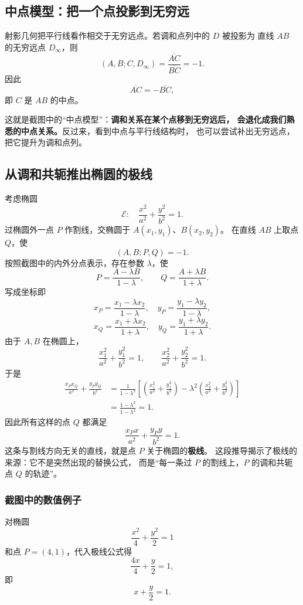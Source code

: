 \documentclass[UTF8]{ctexart}
\begin{document}
	\subsection{中点模型：把一个点投影到无穷远}
	
	射影几何把平行线看作相交于无穷远点。若调和点列中的 $D$ 被投影为
	直线 $AB$ 的无穷远点 $D_\infty$，则
	\[
	(A,B;C,D_\infty)
	=
	\frac{\overline{AC}}{\overline{BC}}
	=-1.
	\]
	因此
	\[
	\overline{AC}=-\overline{BC},
	\]
	即 $C$ 是 $AB$ 的中点。
	
	这就是截图中的“中点模型”：\textbf{调和关系在某个点移到无穷远后，
	会退化成我们熟悉的中点关系。}反过来，看到中点与平行线结构时，
	也可以尝试补出无穷远点，把它提升为调和点列。
	
	\subsection{从调和共轭推出椭圆的极线}
	
	考虑椭圆
	\[
	\mathcal E:\quad \frac{x^2}{a^2}+\frac{y^2}{b^2}=1.
	\]
	过椭圆外一点 $P$ 作割线，交椭圆于 $A(x_1,y_1)$、$B(x_2,y_2)$。
	在直线 $AB$ 上取点 $Q$，使
	\[
	(A,B;P,Q)=-1.
	\]
	按照截图中的内外分点表示，存在参数 $\lambda$，使
	\[
	P=\frac{A-\lambda B}{1-\lambda},
	\qquad
	Q=\frac{A+\lambda B}{1+\lambda}.
	\]
	写成坐标即
	\[
	x_P=\frac{x_1-\lambda x_2}{1-\lambda},
	\quad
	y_P=\frac{y_1-\lambda y_2}{1-\lambda},
	\]
	\[
	x_Q=\frac{x_1+\lambda x_2}{1+\lambda},
	\quad
	y_Q=\frac{y_1+\lambda y_2}{1+\lambda}.
	\]
	由于 $A,B$ 在椭圆上，
	\[
	\frac{x_1^2}{a^2}+\frac{y_1^2}{b^2}=1,
	\qquad
	\frac{x_2^2}{a^2}+\frac{y_2^2}{b^2}=1.
	\]
	于是
	\begin{align*}
	\frac{x_Px_Q}{a^2}+\frac{y_Py_Q}{b^2}
	&=
	\frac{1}{1-\lambda^2}
	\left[
	\left(\frac{x_1^2}{a^2}+\frac{y_1^2}{b^2}\right)
	-\lambda^2
	\left(\frac{x_2^2}{a^2}+\frac{y_2^2}{b^2}\right)
	\right]\\
	&=\frac{1-\lambda^2}{1-\lambda^2}=1.
	\end{align*}
	因此所有这样的点 $Q$ 都满足
	\[
	\boxed{
	\frac{x_Px}{a^2}+\frac{y_Py}{b^2}=1
	}.
	\]
	这条与割线方向无关的直线，就是点 $P$ 关于椭圆的\textbf{极线}。
	这段推导揭示了极线的来源：它不是突然出现的替换公式，
	而是“每一条过 $P$ 的割线上，$P$ 的调和共轭点 $Q$ 的轨迹”。
	
	\subsubsection{截图中的数值例子}
	
	对椭圆
	\[
	\frac{x^2}{4}+\frac{y^2}{2}=1
	\]
	和点 $P=(4,1)$，代入极线公式得
	\[
	\frac{4x}{4}+\frac{y}{2}=1,
	\]
	即
	\[
	\boxed{x+\frac{y}{2}=1}.
	\]
	
\end{document}
